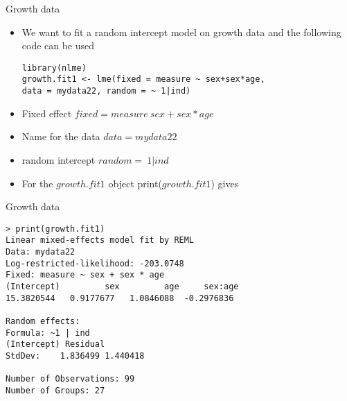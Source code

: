 \documentclass{beamer}
\begin{document}
\begin{frame}[fragile]{Growth data}
\begin{itemize}
	\item We want to fit a random intercept model on growth data and the following code can be used
\begin{verbatim}
library(nlme)
growth.fit1 <- lme(fixed = measure ~ sex+sex*age, 
data = mydata22, random = ~ 1|ind)
\end{verbatim}

\item Fixed effect $fixed = measure ~ sex+sex*age$
\item Name for the data $data = mydata22$
\item random intercept $random = ~ 1|ind$
\item For the $growth.fit1$ object print($growth.fit1$) gives
\end{itemize}
\end{frame}

\begin{frame}[fragile]{Growth data}
\begin{verbatim}
> print(growth.fit1)
Linear mixed-effects model fit by REML
Data: mydata22 
Log-restricted-likelihood: -203.0748
Fixed: measure ~ sex + sex * age 
(Intercept)         sex         age     sex:age 
15.3820544   0.9177677   1.0846088  -0.2976836 

Random effects:
Formula: ~1 | ind
(Intercept) Residual
StdDev:    1.836499 1.440418

Number of Observations: 99
Number of Groups: 27 
\end{verbatim}
\end{frame}
\end{document}
